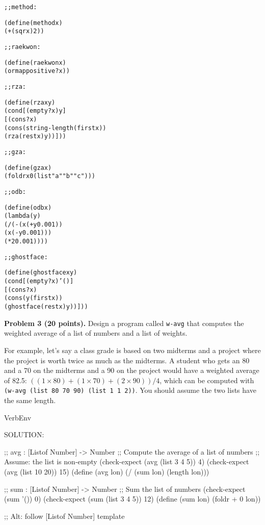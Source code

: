 \documentclass[12pt]{article}
\begin{document}
\begin{alltt}
;; method : 

(define (method x)
  (+ (sqr x) 2))

;; raekwon : 

(define (raekwon x)
  (ormap positive? x))

;; rza : 

(define (rza x y)
  (cond [(empty? x) y]
        [(cons? x)
         (cons (string-length (first x))
               (rza (rest x) y))]))

;; gza : 

(define (gza x)
  (foldr x 0 (list "a" "b" "c")))

;; odb : 

(define (odb x)
  (lambda (y)   
    (/ (- (x (+ y 0.001))
          (x (- y 0.001)))
       (* 2 0.001))))
    

;; ghostface : \censor{[X Y] [Listof X] [X -> Y] -> [Listof Y]}

(define (ghostface x y)
  (cond [(empty? x) '()]
        [(cons? x)
         (cons (y (first x)) 
               (ghostface (rest x) y))]))
\end{alltt}


\newpage

\noindent
{\bf Problem 3 (20 points).}
%
Design a program called {\tt w-avg} that computes the weighted average
of a list of numbers and a list of weights.

For example, let's say a class grade is based on two midterms and a
project where the project is worth twice as much as the midterms.  A
student who gets an 80 and a 70 on the midterms and a 90 on the
project would have a weighted average of 82.5: $((1 \times 80) + (1
\times 70) + (2 \times 90)) / 4$, which can be computed with {\tt
  (w-avg (list 80 70 90) (list 1 1 2))}.  You should assume the two
lists have the same length.


\begin{SaveVerbatim}{VerbEnv}

SOLUTION:

;; avg : [Listof Number] -> Number
;; Compute the average of a list of numbers
;; Assume: the list is non-empty
(check-expect (avg (list 3 4 5)) 4)
(check-expect (avg (list 10 20)) 15)
(define (avg lon)
  (/ (sum lon) 
     (length lon)))

;; sum : [Listof Number] -> Number
;; Sum the list of numbers
(check-expect (sum '()) 0)
(check-expect (sum (list 3 4 5)) 12)
(define (sum lon)
  (foldr + 0 lon))

;; Alt: follow [Listof Number] template
\end{SaveVerbatim}
\end{document}
